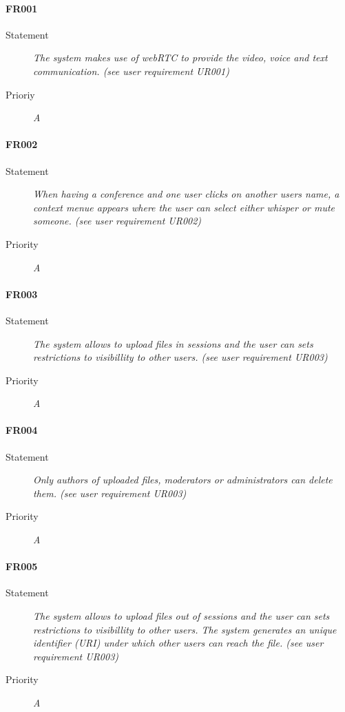 \paragraph{FR001}
\begin{description}
  \item [Statement]
    \textit{The system makes use of \gls{webRTC} to provide the video, voice and text communication.
    (see user requirement UR001)}
  \item [Prioriy] \textit{A}
\end{description}

\paragraph{FR002}
\begin{description}
  \item [Statement] 
    \textit{When having a conference and one user clicks on another users name, a context menue appears where the user can select either whisper or mute someone.
		(see user requirement UR002)}
  \item [Priority] \textit{A}
\end{description}

\paragraph{FR003}
\begin{description}
  \item [Statement] 
    \textit{The system allows to upload files in sessions and the user can sets restrictions to visibillity to other users.
    (see user requirement UR003)}
  \item [Priority] \textit{A}
\end{description}

\paragraph{FR004}
\begin{description}
  \item [Statement] 
    \textit{Only authors of uploaded files, moderators or administrators can delete them.
    (see user requirement UR003)}
  \item [Priority] \textit{A}
\end{description}

\paragraph{FR005}
\begin{description}
  \item [Statement] 
    \textit{The system allows to upload files out of sessions and the user can sets restrictions to visibillity to other users.  The system generates an unique identifier (URI) under which other users can reach the file.
    (see user requirement UR003)}
  \item [Priority] \textit{A}
\end{description}


